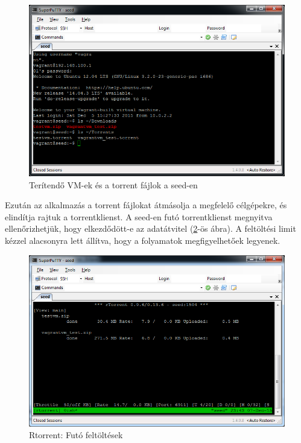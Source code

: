 \begin{figure}[ht]
\centering
\includegraphics[width=140mm, keepaspectratio]{figures/test_seed_files.png}
\caption{Terítendő VM-ek és a torrent fájlok a seed-en}
\label{fig:seed_files}
\end{figure}

Ezután az alkalmazás a torrent fájlokat átmásolja a megfelelő célgépekre, és elindítja rajtuk a torrentklienst. A seed-en futó torrentklienst megnyitva ellenőrizhetjük, hogy elkezdődött-e az adatátvitel (\ref{fig:seed_torrent}-ös ábra). A feltöltési limit kézzel alacsonyra lett állítva, hogy a folyamatok megfigyelhetőek legyenek.

\begin{figure}[ht]
\centering
\includegraphics[width=140mm, keepaspectratio]{figures/test_seed_torrent.png}
\caption{Rtorrent: Futó feltöltések}
\label{fig:seed_torrent}
\end{figure}

